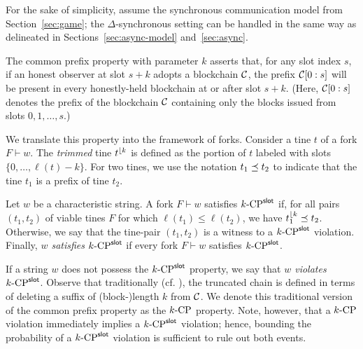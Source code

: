   For the sake of simplicity, 
  assume the synchronous communication model from Section~\ref{sec:game}; 
  the $\Delta$-synchronous setting can be handled in the same way 
  as delineated in Sections~\ref{sec:async-model} and~\ref{sec:async}.

  The common prefix property with parameter $k$ asserts
  that, for any slot index $s$, if an honest observer at slot $s + k$
  adopts a blockchain $\mathcal{C}$, the prefix $\mathcal{C}[0 : s]$ will be
  present in every honestly-held blockchain at or after slot $s + k$.
  (Here, $\mathcal{C}[0 : s]$ denotes the prefix of the blockchain $\mathcal{C}$
  containing only the blocks issued from slots $0, 1, \ldots, s$.)

  We translate this property into the framework of forks.  Consider a
  tine $t$ of a fork $F \vdash w$.  The \emph{trimmed} tine
  $t^{\lfloor {k}}$ is defined as the portion of $t$ labeled with slots
  $\{ 0, \ldots, \ell(t) - k\}$. For two tines, we use the notation
  $t_1 \preceq t_2$ to indicate that the tine $t_1$ is a
  prefix of tine $t_2$.

  \begin{definition}\label{def:cp-slot}
    Let $w$ be a characteristic string. A fork $F \vdash w$ satisfies
    ${k}\text{-}\mathrm{CP}^{\mathsf{slot}}$ if, for all pairs $(t_1, t_2)$ of viable tines $F$ for
    which $\ell(t_1) \leq \ell(t_2)$, we have $t_1^{\lfloor {k}} \preceq t_2$. 
    Otherwise, we say that the tine-pair $(t_1, t_2)$ is a witness to a ${k}\text{-}\mathrm{CP}^{\mathsf{slot}}$ violation.
    Finally, \emph{$w$ satisfies ${k}\text{-}\mathrm{CP}^{\mathsf{slot}}$} if every fork $F \vdash w$ satisfies ${k}\text{-}\mathrm{CP}^{\mathsf{slot}}$.
  \end{definition} 
  If a string $w$ does not possess the ${k}\text{-}\mathrm{CP}^{\mathsf{slot}}$ property, 
  we say that \emph{$w$ violates ${k}\text{-}\mathrm{CP}^{\mathsf{slot}}$}.
  Observe that traditionally
  (cf. \cite{GKL17}), 
  the truncated chain 
  is defined in terms of
  deleting a suffix of (block-)length $k$ from $\mathcal{C}$. 
  We denote this traditional version of the common prefix property as the
  ${k}\text{-}\mathrm{CP}$ property. Note, however, that a ${k}\text{-}\mathrm{CP}$ violation immediately
  implies a ${k}\text{-}\mathrm{CP}^{\mathsf{slot}}$ violation; hence, bounding the probability of a
  ${k}\text{-}\mathrm{CP}^{\mathsf{slot}}$ violation is sufficient to rule out both events.

